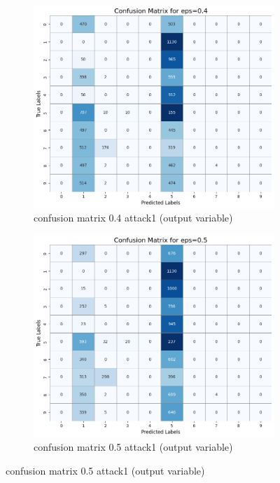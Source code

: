 \documentclass[11pt,onside]{article}
\begin{document}
\begin{figure}[h]
  \centering
  \begin{subfigure}[b]{0.49\textwidth}
    \centering
    \includegraphics[width=\textwidth]{V2_images/target_confusion_matrix_eps_0.4_attack_1.png}
    \caption{confusion matrix 0.4 attack1 (output variable)}
    \label{fig:image1}
  \end{subfigure}
  \hfill
  \begin{subfigure}[b]{0.49\textwidth}
    \centering
    \includegraphics[width=\textwidth]{V2_images/target_confusion_matrix_eps_0.5_attack_1.png}
    \caption{confusion matrix 0.5 attack1 (output variable)}
    \label{fig:image2}
  \end{subfigure}
  
  \label{fig:images}
\end{figure}
\end{document}
